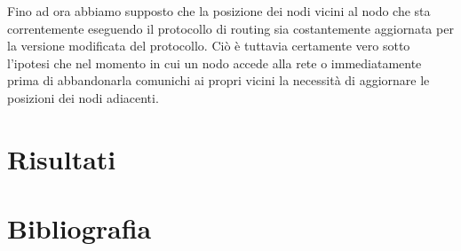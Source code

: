 \documentclass[	
	DIV=calc,
	paper=a4,
	fontsize=11pt,
	onecolumn
]{scrartcl} %
\begin{document}
Fino ad ora abbiamo supposto che la posizione dei nodi vicini al nodo che sta correntemente eseguendo il protocollo di routing sia costantemente aggiornata per la versione modificata del protocollo. Ciò è tuttavia certamente vero sotto l'ipotesi che nel momento in cui un nodo accede alla rete o immediatamente prima di abbandonarla comunichi ai propri vicini la necessità di aggiornare le posizioni dei nodi adiacenti. 
\section{Risultati}


\section{Bibliografia}
\end{document}
